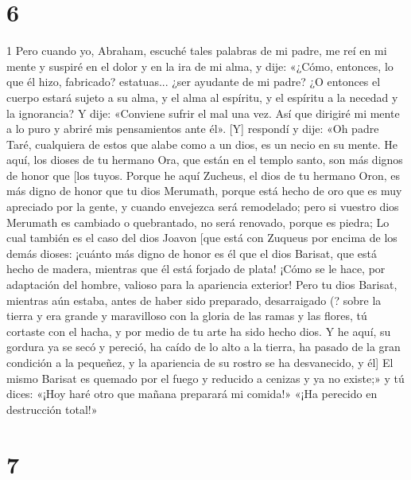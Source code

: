 \chapter{6}

\par 1 Pero cuando yo, Abraham, escuché tales palabras de mi padre, me reí en mi mente y suspiré en el dolor y en la ira de mi alma, y ​​dije: «¿Cómo, entonces, lo que él hizo, fabricado? estatuas... ¿ser ayudante de mi padre? ¿O entonces el cuerpo estará sujeto a su alma, y ​​el alma al espíritu, y el espíritu a la necedad y la ignorancia? Y dije: «Conviene sufrir el mal una vez. Así que dirigiré mi mente a lo puro y abriré mis pensamientos ante él». [Y] respondí y dije: «Oh padre Taré, cualquiera de estos que alabe como a un dios, es un necio en su mente. He aquí, los dioses de tu hermano Ora, que están en el templo santo, son más dignos de honor que [los tuyos. Porque he aquí Zucheus, el dios de tu hermano Oron, es más digno de honor que tu dios Merumath, porque está hecho de oro que es muy apreciado por la gente, y cuando envejezca será remodelado; pero si vuestro dios Merumath es cambiado o quebrantado, no será renovado, porque es piedra; Lo cual también es el caso del dios Joavon [que está con Zuqueus por encima de los demás dioses: ¡cuánto más digno de honor es él que el dios Barisat, que está hecho de madera, mientras que él está forjado de plata! ¡Cómo se le hace, por adaptación del hombre, valioso para la apariencia exterior! Pero tu dios Barisat, mientras aún estaba, antes de haber sido preparado, desarraigado (? sobre la tierra y era grande y maravilloso con la gloria de las ramas y las flores, tú cortaste con el hacha, y por medio de tu arte ha sido hecho dios. Y he aquí, su gordura ya se secó y pereció, ha caído de lo alto a la tierra, ha pasado de la gran condición a la pequeñez, y la apariencia de su rostro se ha desvanecido, y él] El mismo Barisat es quemado por el fuego y reducido a cenizas y ya no existe;» y tú dices: «¡Hoy haré otro que mañana preparará mi comida!» «¡Ha perecido en destrucción total!»

\chapter{7}

